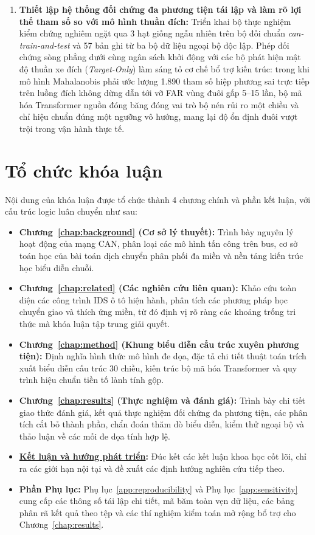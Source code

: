 \documentclass[12pt, a4paper, reqno, oneside]{book}
\newcommand\sect[1]{%
  \Needspace{5\baselineskip}%
  \phantomsection%
  \addcontentsline{toc}{section}{#1}%
  \section*{#1}%
}
\begin{document}
\begin{enumerate}
    \item \textbf{Thiết lập hệ thống đối chứng đa phương tiện tái lập và làm rõ lợi thế tham số so với mô hình thuần đích:} Triển khai bộ thực nghiệm kiểm chứng nghiêm ngặt qua 3 hạt giống ngẫu nhiên trên bộ đối chuẩn \textit{can-train-and-test} và 57 bản ghi từ ba bộ dữ liệu ngoại bộ độc lập. Phép đối chứng sòng phẳng dưới cùng ngân sách khởi động với các bộ phát hiện mật độ thuần xe đích (\textit{Target-Only}) làm sáng tỏ cơ chế bổ trợ kiến trúc: trong khi mô hình Mahalanobis phải ước lượng 1.890 tham số hiệp phương sai trực tiếp trên luồng đích không dừng dẫn tới vỡ FAR vùng đuôi gấp 5--15 lần, bộ mã hóa Transformer nguồn đóng băng đóng vai trò bộ nén rủi ro một chiều và chỉ hiệu chuẩn đúng một ngưỡng vô hướng, mang lại độ ổn định đuôi vượt trội trong vận hành thực tế.
\end{enumerate}

\sect{Tổ chức khóa luận}
Nội dung của khóa luận được tổ chức thành 4 chương chính và phần kết luận, với cấu trúc logic luân chuyển như sau:
\begin{itemize}
    \item \textbf{Chương~\ref{chap:background} (Cơ sở lý thuyết):} Trình bày nguyên lý hoạt động của mạng CAN, phân loại các mô hình tấn công trên bus, cơ sở toán học của bài toán dịch chuyển phân phối đa miền và nền tảng kiến trúc học biểu diễn chuỗi.
    \item \textbf{Chương~\ref{chap:related} (Các nghiên cứu liên quan):} Khảo cứu toàn diện các công trình IDS ô tô hiện hành, phân tích các phương pháp học chuyển giao và thích ứng miền, từ đó định vị rõ ràng các khoảng trống tri thức mà khóa luận tập trung giải quyết.
    \item \textbf{Chương~\ref{chap:method} (Khung biểu diễn cấu trúc xuyên phương tiện):} Định nghĩa hình thức mô hình đe dọa, đặc tả chi tiết thuật toán trích xuất biểu diễn cấu trúc 30 chiều, kiến trúc bộ mã hóa Transformer và quy trình hiệu chuẩn tiền tố lành tính gộp.
    \item \textbf{Chương~\ref{chap:results} (Thực nghiệm và đánh giá):} Trình bày chi tiết giao thức đánh giá, kết quả thực nghiệm đối chứng đa phương tiện, các phân tích cắt bỏ thành phần, chẩn đoán thăm dò biểu diễn, kiểm thử ngoại bộ và thảo luận về các mối đe dọa tính hợp lệ.
    \item \textbf{\hyperref[chap:conclusion]{Kết luận và hướng phát triển}:} Đúc kết các kết luận khoa học cốt lõi, chỉ ra các giới hạn nội tại và đề xuất các định hướng nghiên cứu tiếp theo.
    \item \textbf{Phần Phụ lục:} Phụ lục~\ref{app:reproducibility} và Phụ lục~\ref{app:sensitivity} cung cấp các thông số tái lập chi tiết, mã băm toàn vẹn dữ liệu, các bảng phân rã kết quả theo tệp và các thí nghiệm kiểm toán mở rộng bổ trợ cho Chương~\ref{chap:results}.
\end{itemize}
\end{document}
